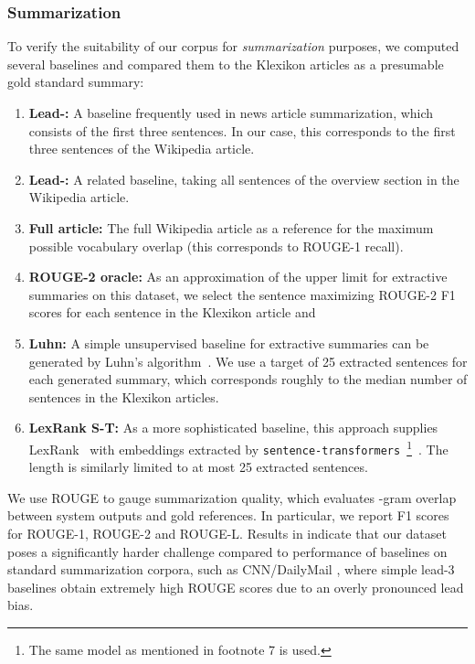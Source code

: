 \documentclass[10pt, a4paper]{article}
\begin{document}
\subsubsection{Summarization}
To verify the suitability of our corpus for \emph{summarization} purposes, we computed several  baselines and compared them to the Klexikon articles as a presumable gold standard summary:
\begin{enumerate}
	\item \textbf{Lead-:} A baseline frequently used in news article summarization, which consists of the first three sentences. In our case, this corresponds to the first three sentences of the Wikipedia article.
	\item \textbf{Lead-:} A related baseline, taking all sentences of the overview section in the Wikipedia article.
	\item \textbf{Full article:} The full Wikipedia article as a reference for the maximum possible vocabulary overlap (this corresponds to ROUGE-1 recall).
	\item \textbf{ROUGE-2 oracle:} As an approximation of the upper limit for extractive summaries on this dataset, we select the sentence maximizing ROUGE-2 F1 scores for each sentence in the Klexikon article and 
	\item \textbf{Luhn:} A simple unsupervised baseline for extractive summaries can be generated by Luhn's algorithm~\cite{luhn-1958-automatic}. We use a target of 25 extracted sentences for each generated summary, which corresponds roughly to the median number of sentences in the Klexikon articles.
	\item \textbf{LexRank S-T:} As a more sophisticated baseline, this approach supplies LexRank~\cite{erkan-radev-2004-lexrank} with embeddings extracted by \texttt{sentence-transformers}~\cite{reimers-gurevych-2019-sentence}\footnote{The same model as mentioned in footnote 7 is used.}~. The length is similarly limited to at most 25 extracted sentences.
	
\end{enumerate}

We use ROUGE \cite{lin-2004-rouge} to gauge summarization quality, which evaluates -gram overlap between system outputs and gold references. In particular, we report F1 scores for ROUGE-1, ROUGE-2 and ROUGE-L.
Results in  indicate that our dataset poses a significantly harder challenge compared to performance of baselines on standard summarization corpora, such as CNN/DailyMail \cite{nallapati2017summarunner}, where simple lead-3 baselines obtain extremely high ROUGE scores due to an overly pronounced lead bias.
\end{document}
